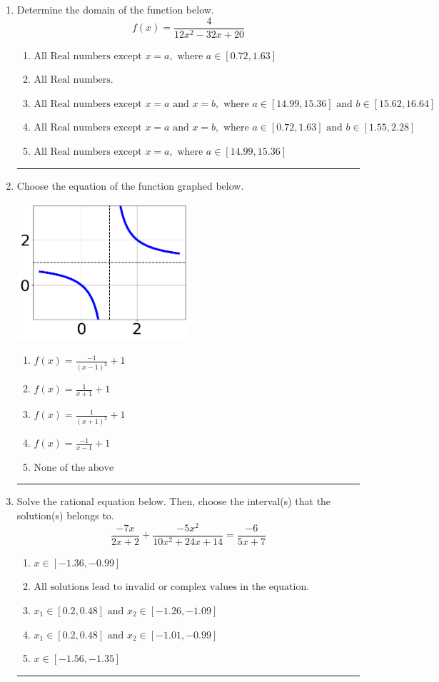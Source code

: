 \documentclass[14pt]{extbook}
\newcommand{\litem}[1]{\item#1\hspace*{-1cm}\rule{\textwidth}{0.4pt}}
\begin{document}
\begin{enumerate}
\litem{
Determine the domain of the function below.\[ f(x) = \frac{4}{12x^{2} -32 x + 20} \]\begin{enumerate}[label=\Alph*.]
\item \( \text{All Real numbers except } x = a, \text{ where } a \in [0.72, 1.63] \)
\item \( \text{All Real numbers.} \)
\item \( \text{All Real numbers except } x = a \text{ and } x = b, \text{ where } a \in [14.99, 15.36] \text{ and } b \in [15.62, 16.64] \)
\item \( \text{All Real numbers except } x = a \text{ and } x = b, \text{ where } a \in [0.72, 1.63] \text{ and } b \in [1.55, 2.28] \)
\item \( \text{All Real numbers except } x = a, \text{ where } a \in [14.99, 15.36] \)

\end{enumerate} }
\litem{
Choose the equation of the function graphed below.
\begin{center}
    \includegraphics[width=0.5\textwidth]{../Figures/rationalGraphToEquationC.png}
\end{center}
\begin{enumerate}[label=\Alph*.]
\item \( f(x) = \frac{-1}{(x - 1)^2} + 1 \)
\item \( f(x) = \frac{1}{x + 1} + 1 \)
\item \( f(x) = \frac{1}{(x + 1)^2} + 1 \)
\item \( f(x) = \frac{-1}{x - 1} + 1 \)
\item \( \text{None of the above} \)

\end{enumerate} }
\litem{
Solve the rational equation below. Then, choose the interval(s) that the solution(s) belongs to.\[ \frac{-7x}{2x + 2} + \frac{-5x^{2}}{10x^{2} +24 x + 14} = \frac{-6}{5x + 7} \]\begin{enumerate}[label=\Alph*.]
\item \( x \in [-1.36,-0.99] \)
\item \( \text{All solutions lead to invalid or complex values in the equation.} \)
\item \( x_1 \in [0.2, 0.48] \text{ and } x_2 \in [-1.26,-1.09] \)
\item \( x_1 \in [0.2, 0.48] \text{ and } x_2 \in [-1.01,-0.99] \)
\item \( x \in [-1.56,-1.35] \)


\end{enumerate}}
\end{enumerate}
\end{document}
